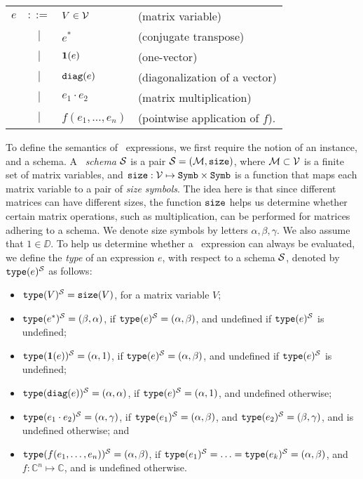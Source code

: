 \medskip

\begin{tabular}{lcll}
$e$ & $::=$ & $V\in \mathcal{V}$ & (matrix variable)\\
 & $|$ & $e^*$ & (conjugate transpose)\\ 
 & $|$ & $\mathbf{1}(e)$ & (one-vector)\\ 
 & $|$ & $\texttt{diag}(e)$ & (diagonalization of a vector)\\  
 & $|$ & $e_1 \cdot e_2$ & (matrix multiplication)\\   
 & $|$ & $f(e_1,\ldots ,e_n)$ & (pointwise application of $f$).    
\end{tabular}

\medskip

To define the semantics of \lang\ expressions, we first require the notion of an instance, and a schema. A \lang\ {\em schema} $\mathcal{S}$ is a pair $\mathcal{S}=(\mathcal{M},\texttt{size})$, where $\mathcal{M}\subset \mathcal{V}$ is a finite set of matrix variables, and $\texttt{size}: \mathcal{V} \mapsto \texttt{Symb}\times \texttt{Symb}$ is a function that maps each matrix variable to a pair of {\em size symbols}. The idea here is that since different matrices can have different sizes, the function $\texttt{size}$ helps us determine whether certain matrix operations, such as multiplication, can be performed for matrices adhering to a schema. We denote size symbols by letters $\alpha,\beta,\gamma$. We also assume that $1\in \DD$. To help us determine whether a \lang\ expression can always be evaluated, we define the {\em type} of an expression $e$, with respect to a schema $\mathcal{S}$, denoted by $\texttt{type}(e)^{\mathcal{S}}$ as follows:
\begin{itemize}
\item $\texttt{type}(V)^{\mathcal{S}} = \texttt{size}(V)$, for a matrix variable $V$;
\item $\texttt{type}(e^*)^{\mathcal{S}} = (\beta,\alpha)$, if $\texttt{type}(e)^{\mathcal{S}}=(\alpha,\beta)$, and undefined if $\texttt{type}(e)^{\mathcal{S}}$ is undefined;
\item $\texttt{type}(\mathbf{1}(e))^{\mathcal{S}} = (\alpha,1)$, if $\texttt{type}(e)^{\mathcal{S}}=(\alpha,\beta)$, and undefined if $\texttt{type}(e)^{\mathcal{S}}$ is undefined;
\item $\texttt{type}(\texttt{diag}(e))^{\mathcal{S}} = (\alpha,\alpha)$, if $\texttt{type}(e)^{\mathcal{S}}=(\alpha,1)$, and undefined otherwise;
\item $\texttt{type}(e_1 \cdot e_2)^{\mathcal{S}} = (\alpha,\gamma)$, if $\texttt{type}(e_1)^{\mathcal{S}}=(\alpha,\beta)$, and $\texttt{type}(e_2)^{\mathcal{S}}=(\beta,\gamma)$, and is undefined otherwise; and
\item $\texttt{type}(f(e_1,\ldots ,e_n))^{\mathcal{S}} = (\alpha,\beta)$, if $\texttt{type}(e_1)^{\mathcal{S}} = \ldots = \texttt{type}(e_k)^{\mathcal{S}} = (\alpha,\beta)$, and $f:\mathbb{C}^n \mapsto  \mathbb{C}$, and is undefined otherwise.
\end{itemize}

